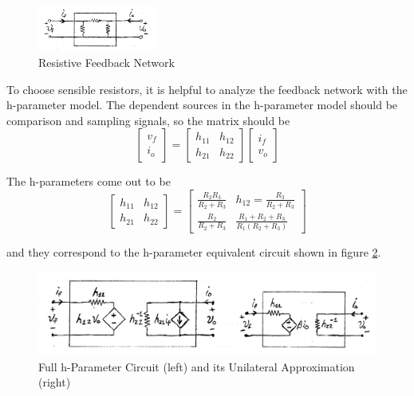 \documentclass[titlepage, letterpaper, 10.5pt]{article}
\begin{document}
\begin{figure}[ht]
	\centering
	\includegraphics[width=0.35\textwidth]{diagrams/feedback-network}
	\caption{Resistive Feedback Network}
	\label{feedback-network}
\end{figure}

To choose sensible resistors, it is helpful to analyze the feedback network with the h-parameter model.
The dependent sources in the h-parameter model should be comparison and sampling signals, so the matrix should be
\begin{equation*}
\left[ \begin{array}{c}
v_{f}	\\
i_{o}	\end{array}	\right]
=\left[	\begin{array}{cc}
h_{11}	&	h_{12}	\\
h_{21}	&	h_{22}	\end{array}	\right]
\left[	\begin{array}{c}
i_{f}	\\
v_{o}	\end{array}	\right]
\end{equation*}

The h-parameters come out to be
\begin{equation*}
\left[	\begin{array}{cc}
h_{11}	&	h_{12}	\\
h_{21}	&	h_{22}	\end{array}	\right]
=\left[	\begin{array}{cc}
\frac{R_{2}R_{3}}{R_{2}+R_{3}}	&	h_{12}=\frac{R_{3}}{R_{2}+R_{3}}	\\
\frac{R_{2}}{R_{2}+R_{3}}	&	\frac{R_{1}+R_{2}+R_{3}}{R_{1}(R_{2}+R_{3})}	\end{array}	\right]
\end{equation*}

and they correspond to the h-parameter equivalent circuit shown in figure \ref{h-parameter-equivalent-network}.

\begin{figure}[ht]
	\centering
	\includegraphics[width=.8\textwidth]{diagrams/h-parameter-equivalent-network}
	\caption{Full h-Parameter Circuit (left) and its Unilateral Approximation (right)}
	\label{h-parameter-equivalent-network}
\end{figure}
\end{document}
